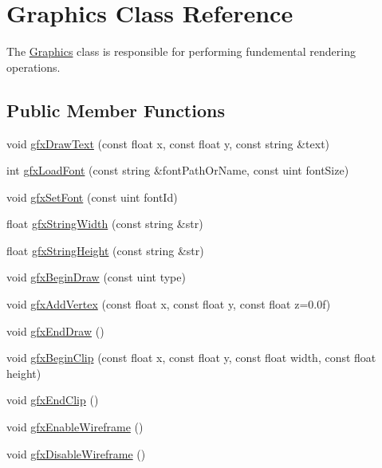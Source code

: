 \hypertarget{class_graphics}{\section{Graphics Class Reference}
\label{class_graphics}
}


The \hyperlink{class_graphics}{Graphics} class is responsible for performing fundemental rendering operations.  


\subsection*{Public Member Functions}
\begin{DoxyCompactItemize}
\item 
void \hyperlink{class_graphics_a8f622d0db9014c54d7bdc37f9cb4a49a}{gfx\+Draw\+Text} (const float x, const float y, const string \&text)
\item 
int \hyperlink{class_graphics_a0d7bac934882fe3a33797c231cd83ce4}{gfx\+Load\+Font} (const string \&font\+Path\+Or\+Name, const uint font\+Size)
\item 
void \hyperlink{class_graphics_aeb86cbfdc5f98849dad77316e835ac6c}{gfx\+Set\+Font} (const uint font\+Id)
\item 
float \hyperlink{class_graphics_aa915b255eba699cf4c3aa9a4498a5ab0}{gfx\+String\+Width} (const string \&str)
\item 
float \hyperlink{class_graphics_a5866b23d270178dd7f2856fd795ad42d}{gfx\+String\+Height} (const string \&str)
\item 
void \hyperlink{class_graphics_ae925edf6f7d9efda6d94e56ebe858935}{gfx\+Begin\+Draw} (const uint type)
\item 
void \hyperlink{class_graphics_a70c6cf4503b69f16ff1b49d8a5410ece}{gfx\+Add\+Vertex} (const float x, const float y, const float z=0.\+0f)
\item 
void \hyperlink{class_graphics_af286ffa2faeadbfe7f72a17a43b1fe0d}{gfx\+End\+Draw} ()
\item 
void \hyperlink{class_graphics_a9c0bf7b24d813a5e31013b6e18f0f3c0}{gfx\+Begin\+Clip} (const float x, const float y, const float width, const float height)
\item 
void \hyperlink{class_graphics_af4a0cc5869601b4055ad60556fe29792}{gfx\+End\+Clip} ()
\item 
void \hyperlink{class_graphics_ab06d4f50a5567b91702d0e3b71a36b0c}{gfx\+Enable\+Wireframe} ()
\item 
void \hyperlink{class_graphics_ada9df052df0be7d1996827a28dbc54cd}{gfx\+Disable\+Wireframe} ()

\end{DoxyCompactItemize}
